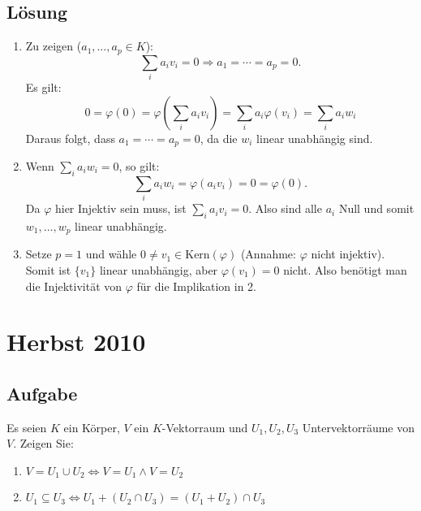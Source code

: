 \subsection{Lösung}
\begin{enumerate}
	\item Zu zeigen (\( a_1, \dots, a_p \in K \)):
	\begin{equation*}
	 	\sum_ia_iv_i = 0 \Rightarrow a_1 = \cdots = a_p = 0\text{.}
	 \end{equation*} 
	 Es gilt:
	 \begin{equation*}
	 	0 = \varphi(0) = \varphi \left( \sum_ia_iv_i \right) = \sum_ia_i\varphi(v_i) = \sum_ia_iw_i
	 \end{equation*}
	 Daraus folgt, dass \( a_1 = \cdots = a_p = 0 \), da die \( w_i \) linear unabhängig sind.

	 \item Wenn \( \sum_ia_iw_i = 0 \), so gilt:
	 \begin{equation*}
	 	\sum_ia_iw_i = \varphi \left( a_iv_i \right) = 0 = \varphi(0)\text{.}
	 \end{equation*}
	 Da \( \varphi \) hier Injektiv sein muss, ist \( \sum_ia_iv_i = 0 \). Also sind alle \( a_i \) Null und somit \( w_1, \dots, w_p \) linear unabhängig.

	 \item Setze \( p = 1 \) und wähle \( 0 \neq v_1 \in \text{Kern}(\varphi) \) (Annahme: \( \varphi \) nicht injektiv). Somit ist \( \{ v_1 \} \) linear unabhängig, aber \( \varphi(v_1) = 0 \) nicht. Also benötigt man die Injektivität von \( \varphi \) für die Implikation in 2.
\end{enumerate}

\newpage

\section{Herbst 2010}

\subsection{Aufgabe}
Es seien \( K \) ein Körper, \( V \) ein \( K \)-Vektorraum und \( U_1, U_2, U_3 \) Untervektorräume von \( V \). Zeigen Sie:
\begin{enumerate}
	\item \( V = U_1 \cup U_2 \Leftrightarrow V = U_1 \wedge V = U_2 \) 
	\item \( U_1 \subseteq U_3 \Leftrightarrow U_1 + (U_2 \cap U_3) = (U_1 + U_2) \cap U_3 \)
\end{enumerate}

